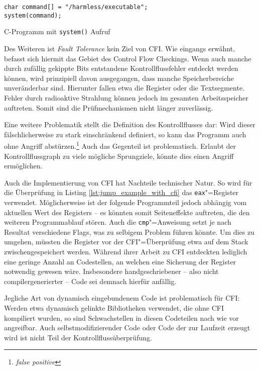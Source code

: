 \begin{listing}
\begin{verbatim}
char command[] = "/harmless/executable";
system(command);
\end{verbatim}
\caption{C-Programm mit \texttt{system()} Aufruf}
\label{lst:c_system}
\end{listing}

Des Weiteren ist \emph{Fault Tolerance} kein Ziel von CFI. Wie eingangs erwähnt, befasst sich hiermit das Gebiet des Control Flow Checkings. Wenn auch manche durch zufällig gekippte Bits entstandene Kontrollflussfehler entdeckt werden können, wird prinzipiell davon ausgegangen, dass manche Speicherbereiche unveränderbar sind. Hierunter fallen etwa die Register oder die Textsegmente. Fehler durch radioaktive Strahlung können jedoch im gesamten Arbeitsspeicher auftreten. Somit sind die Prüfmechanismen nicht länger zuverlässig.

Eine weitere Problematik stellt die Definition des Kontrollflusses dar: Wird dieser fälschlicherweise zu stark einschränkend definiert, so kann das Programm auch ohne Angriff abstürzen.\footnote{\emph{false positive}} Auch das Gegenteil ist problematisch. Erlaubt der Kontrollflussgraph zu viele mögliche Sprungziele, könnte dies einen Angriff ermöglichen.


Auch die Implementierung von CFI hat Nachteile technischer Natur. So wird für die Überprüfung in Listing \ref{lst:jump_example_with_cfi} das \texttt{eax}"=Register verwendet. Möglicherweise ist der folgende Programmteil jedoch abhängig vom aktuellen Wert des Registers -- es könnten somit Seiteneffekte auftreten, die den weiteren Programmablauf stören. Auch die \texttt{cmp}"=Anweisung setzt je nach Resultat verschiedene Flags, was zu selbigem Problem führen könnte. Um dies zu umgehen, müssten die Register vor der CFI"=Überprüfung etwa auf dem Stack zwischengespeichert werden. Während ihrer Arbeit zu CFI entdeckten \cite{Abadi.2009} lediglich eine geringe Anzahl an Codestellen, an welchen eine Sicherung der Register notwendig gewesen wäre. Insbesondere handgeschriebener -- also nicht compilergenerierter -- Code sei demnach hierfür anfällig.

Jegliche Art von dynamisch eingebundenem Code ist problematisch für CFI: Werden etwa dynamisch gelinkte Bibliotheken verwendet, die ohne CFI kompiliert wurden, so sind Schwachstellen in diesen Codeteilen nach wie vor angreifbar. Auch selbstmodifizierender Code oder Code der zur Laufzeit erzeugt wird ist nicht Teil der Kontrollflussüberprüfung.


